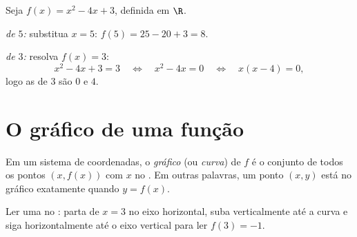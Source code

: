 \begin{example}\label{ex:g10:functions:images}
Seja $f(x) = x^2 - 4x + 3$, definida em $\R$.

\emph{ de $5$:} substitua $x = 5$:
$f(5) = 25 - 20 + 3 = 8$.

\emph{ de $3$:} resolva $f(x) = 3$:
\[
x^2 - 4x + 3 = 3
\quad\Longleftrightarrow\quad
x^2 - 4x = 0
\quad\Longleftrightarrow\quad
x(x - 4) = 0,
\]
logo as  de $3$ são $0$ e $4$.
\end{example}

\section{O gráfico de uma função}

\begin{definition}[Gráfico]\label{def:g10:functions:graph}
Em um sistema de coordenadas, o \emph{gráfico} (ou
\emph{curva}) de $f$ é o conjunto de todos os pontos $(x, f(x))$ com $x$
no . Em outras palavras, um ponto $(x, y)$ está no gráfico
exatamente quando $y = f(x)$.
\end{definition}

\begin{omfigure}

{\small Ler uma  no : parta de $x = 3$ no eixo horizontal,
suba verticalmente até a curva e siga horizontalmente até o eixo vertical
para ler $f(3) = -1$.}
\end{omfigure}

